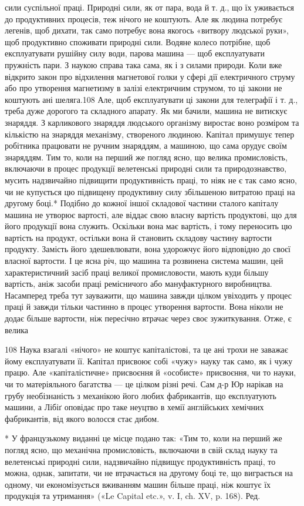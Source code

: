 сили суспільної праці. Природні сили, як от пара, вода й т. д.,
що їх уживається до продуктивних процесів, теж нічого не
коштують. Але як людина потребує легенів, щоб дихати, так само
потребує вона якогось «витвору людської руки», щоб продуктивно
споживати природні сили. Водяне колесо потрібне, щоб
експлуатувати рушійну силу води, парова машина — щоб експлуатувати
пружність пари. З наукою справа така сама, як і з силами
природи. Коли вже відкрито закон про відхилення магнетової
голки у сфері дії електричного струму або про утворення магнетизму
в залізі електричним струмом, то ці закони не коштують
ані шеляга.108 Але, щоб експлуатувати ці закони для телеграфії
і т. д., треба дуже дорогого та складного апарату. Як ми бачили,
машина не витискує знаряддя. З карликового знаряддя людського
організму виростає воно розміром та кількістю на знаряддя механізму,
створеного людиною. Капітал примушує тепер робітника
працювати не ручним знаряддям, а машиною, що сама орудує
своїм знаряддям. Тим то, коли на перший же погляд ясно, що
велика промисловість, включаючи в процес продукції велетенські
природні сили та природознавство, мусить надзвичайно
підвищити продуктивність праці, то ніяк не є так само ясно,
чи не купується цю підвищену продуктивну силу збільшеною
витратою праці на другому боці.* Подібно до кожної іншої складової
частини сталого капіталу машина не утворює вартості,
але віддає свою власну вартість продуктові, що для його продукції
вона служить. Оскільки вона має вартість, і тому переносить
цю вартість на продукт, остільки вона й становить складову
частину вартости продукту. Замість його здешевлювати, вона
удорожчує його відповідно до своєї власної вартости. І це ясна
річ, що машина та розвинена система машин, цей характеристичний
засіб праці великої промисловости, мають куди більшу вартість,
аніж засоби праці ремісничого або мануфактурного виробництва.
Насамперед треба тут зауважити, що машина завжди цілком
увіходить у процес праці й завжди тільки частинно в процес
утворення вартости. Вона ніколи не додає більше вартости,
ніж пересічно втрачає через своє зужиткування. Отже, є велика

108 Наука взагалі «нічого» не коштує капіталістові, та це ані трохи
не заважає йому експлуатувати її. Капітал присвоює собі «чужу» науку
так само, як і чужу працю. Але «капіталістичне» присвоєння й «особисте»
присвоєння, чи то науки, чи то матеріяльного багатства — це цілком різні
речі. Сам д-р Юр нарікав на грубу необізнаність з механікою його любих
фабрикантів, що експлуатують машини, а Лібіґ оповідає про таке неуцтво
в хемії англійських хемічних фабрикантів, від якого волосся стає дибом.

* У французькому виданні це місце подано так: «Тим то, коли на
перший же погляд ясно, що механічна промисловість, включаючи в свій
склад науку та велетенські природні сили, надзвичайно підвищує продуктивність
праці, то можна, однак, запитати, чи не втрачається на другому
боці те, що виграється на одному, чи економізується вживанням
машин більше праці, ніж коштує їх продукція та утримання» («Le Capital
etc.», v. I, ch. XV, p. 168). Ред.
